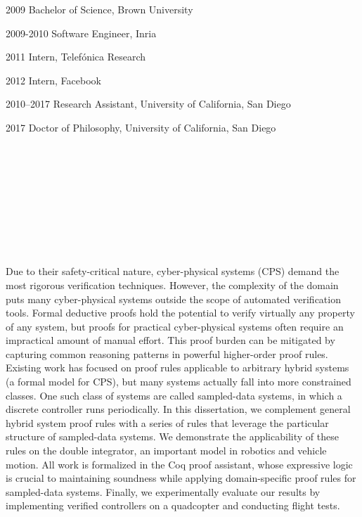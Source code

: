 \documentclass[12pt]{ucsddissertation}
\begin{document}
\begin{vita}
\noindent
\begin{cv}{}
\begin{cvlist}{}
\item[2009] Bachelor of Science, Brown University
\item[2009-2010] Software Engineer, Inria
\item[2011] Intern, Telef\'onica Research
\item[2012] Intern, Facebook
\item[2010--2017] Research Assistant, University of California, San
Diego
\item[2017] Doctor of Philosophy, University of California, San Diego
\end{cvlist}
\end{cv}

\publications
\noindent{}
\\ \\
\noindent{}
\\ \\
\noindent{}
\\ \\
\noindent{}
\\ \\
\noindent{}

\end{vita}

\begin{dissertationabstract}
Due to their safety-critical nature, cyber-physical systems (CPS) demand
the most rigorous verification techniques. However, the complexity of the
domain puts many cyber-physical systems outside the scope of automated
verification tools. Formal deductive proofs hold the potential to verify
virtually any property of any system, but proofs for practical
cyber-physical systems often require an impractical amount of manual
effort. This proof burden can be mitigated by capturing common reasoning
patterns in powerful higher-order proof rules. Existing work has focused on
proof rules applicable to arbitrary hybrid systems (a formal model for
CPS), but many systems actually fall into more constrained classes. One
such class of systems are called sampled-data systems, in which a discrete
controller runs periodically. In this dissertation, we complement general
hybrid system proof rules with a series of rules that leverage the
particular structure of sampled-data systems. We demonstrate the
applicability of these rules on the double integrator, an important model
in robotics and vehicle motion. All work is formalized in the Coq proof
assistant, whose expressive logic is crucial to maintaining soundness while
applying domain-specific proof rules for sampled-data systems. Finally, we
experimentally evaluate our results by implementing verified controllers on
a quadcopter and conducting flight tests.
\end{dissertationabstract}
\end{document}
